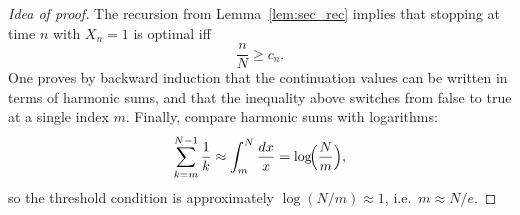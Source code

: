 \begin{proof}[Idea of proof]
The recursion from Lemma~\ref{lem:sec_rec} implies that stopping at time $n$ with $X_n=1$ is optimal iff
\[
\frac{n}{N} \ge c_n.
\]
One proves by backward induction that the continuation values can be written in terms of harmonic sums,
and that the inequality above switches from false to true at a single index $m$.
Finally, compare harmonic sums with logarithms:
\[
\sum_{k=m}^{N-1}\frac{1}{k}\approx \int_m^N \frac{dx}{x}=\log\!\Bigl(\frac{N}{m}\Bigr),
\]
so the threshold condition is approximately $\log(N/m)\approx 1$, i.e.\ $m\approx N/e$.
\end{proof}


